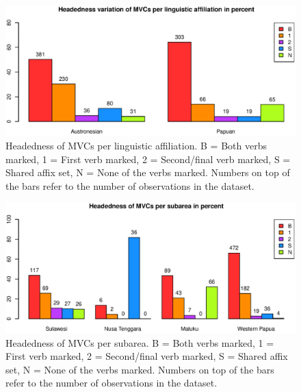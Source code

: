 \begin{figure}
\includegraphics[width=\columnwidth]{figures/Headedness_Family.eps}
\caption[Headedness of MVCs per linguistic affiliation]{Headedness of MVCs per linguistic affiliation. B = Both verbs marked, 1 = First verb marked, 2 = Second/final verb marked, S = Shared affix set, N = None of the verbs marked. Numbers on top of the bars refer to the number of observations in the dataset.}\label{fig:head-family}
\end{figure}
\begin{figure}
\includegraphics[width=\columnwidth]{figures/Headedness_Group.eps}
\caption[Headedness of MVCs per subarea]{Headedness of MVCs per subarea. B = Both verbs marked, 1 = First verb marked, 2 = Second/final verb marked, S = Shared affix set, N = None of the verbs marked. Numbers on top of the bars refer to the number of observations in the dataset.}\label{fig:head-group}
\end{figure}

